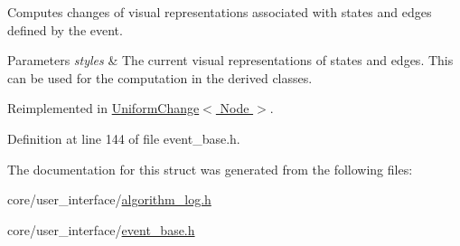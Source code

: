 Computes changes of visual representations associated with states and edges defined by the event. 


\begin{DoxyParams}{Parameters}
{\em styles} & The current visual representations of states and edges. This can be used for the computation in the derived classes. \\
\hline
\end{DoxyParams}


Reimplemented in \hyperlink{structUniformChange_a5501ba4ef1cab1b1d84b574f85756744}{Uniform\+Change$<$ Node $>$}.



Definition at line 144 of file event\+\_\+base.\+h.



The documentation for this struct was generated from the following files\+:\begin{DoxyCompactItemize}
\item 
core/user\+\_\+interface/\hyperlink{algorithm__log_8h}{algorithm\+\_\+log.\+h}\item 
core/user\+\_\+interface/\hyperlink{event__base_8h}{event\+\_\+base.\+h}\end{DoxyCompactItemize}
